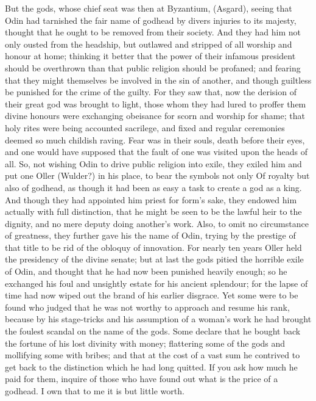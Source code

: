 \documentclass[10pt,a4paper]{report}
\begin{document}
But the gods, whose chief seat was then at Byzantium, (Asgard), seeing that Odin had tarnished the fair name of godhead by divers injuries to its majesty, thought that he ought to be removed from their society. And they had him not only ousted from the headship, but outlawed and stripped of all worship and honour at home; thinking it better that the power of their infamous president should be overthrown than that public religion should be profaned; and fearing that they might themselves be involved in the sin of another, and though guiltless be punished for the crime of the guilty. For they saw that, now the derision of their great god was brought to light, those whom they had lured to proffer them divine honours were exchanging obeisance for scorn and worship for shame; that holy rites were being accounted sacrilege, and fixed and regular ceremonies deemed so much childish raving. Fear was in their souls, death before their eyes, and one would have supposed that the fault of one was visited upon the heads of all. So, not wishing Odin to drive public religion into exile, they exiled him and put one Oller (Wulder?) in his place, to bear the symbols not only Of royalty but also of godhead, as though it had been as easy a task to create a god as a king. And though they had appointed him priest for form's sake, they endowed him actually with full distinction, that he might be seen to be the lawful heir to the dignity, and no mere deputy doing another's work. Also, to omit no circumstance of greatness, they further gave his the name of Odin, trying by the prestige of that title to be rid of the obloquy of innovation. For nearly ten years Oller held the presidency of the divine senate; but at last the gods pitied the horrible exile of Odin, and thought that he had now been punished heavily enough; so he exchanged his foul and unsightly estate for his ancient splendour; for the lapse of time had now wiped out the brand of his earlier disgrace. Yet some were to be found who judged that he was not worthy to approach and resume his rank, because by his stage-tricks and his assumption of a woman's work he had brought the foulest scandal on the name of the gods. Some declare that he bought back the fortune of his lost divinity with money; flattering some of the gods and mollifying some with bribes; and that at the cost of a vast sum he contrived to get back to the distinction which he had long quitted. If you ask how much he paid for them, inquire of those who have found out what is the price of a godhead. I own that to me it is but little worth.\\
\end{document}
